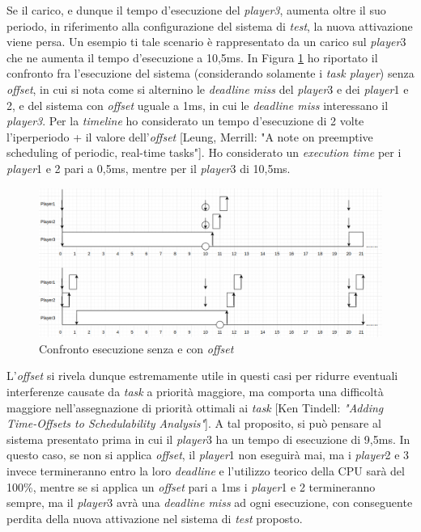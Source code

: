 \documentclass{article}
\begin{document}
Se il carico, e dunque il tempo d'esecuzione del \textit{player3}, aumenta oltre il suo periodo, in riferimento alla configurazione del sistema di \textit{test}, la nuova attivazione viene persa.
Un esempio ti tale scenario è rappresentato da un carico sul \textit{player}3 che ne aumenta il tempo d'esecuzione a 10,5ms.
In Figura \ref{timeline} ho riportato il confronto fra l'esecuzione del sistema (considerando solamente i \textit{task player}) senza \textit{offset}, in cui si nota come si alternino le \textit{deadline miss} del \textit{player}3 e dei \textit{player}1 e 2, e del sistema con \textit{offset} uguale a 1ms, in cui le \textit{deadline miss} interessano il \textit{player3}. Per la \textit{timeline} ho considerato un tempo d'esecuzione di 2 volte l'iperperiodo + il valore dell'\textit{offset} [Leung, Merrill: "A note on preemptive scheduling of periodic, real-time tasks"].
Ho considerato un \textit{execution time} per i \textit{player}1 e 2 pari a 0,5ms, mentre per il \textit{player}3 di 10,5ms.

\begin{figure}[!htbp]
	\centering
	\includegraphics[width=6in]{Approfondimento/timeline.png}
	\caption{Confronto esecuzione senza e con \textit{offset}}
	\label{timeline}
\end{figure}

L'\textit{offset} si rivela dunque estremamente utile in questi casi per ridurre eventuali interferenze causate da \textit{task} a priorità maggiore, ma comporta una difficoltà maggiore nell'assegnazione di priorità ottimali ai \textit{task} [Ken Tindell: \textit{"Adding Time-Offsets to Schedulability Analysis"}].
A tal proposito, si può pensare al sistema presentato prima in cui il \textit{player}3 ha un tempo di esecuzione di 9,5ms. In questo caso, se non si applica \textit{offset}, il \textit{player}1 non eseguirà mai, ma i \textit{player}2 e 3 invece termineranno entro la loro \textit{deadline} e l'utilizzo teorico della CPU sarà del 100\%, mentre se si applica un \textit{offset} pari a 1ms i \textit{player}1 e 2 termineranno sempre, ma il \textit{player}3 avrà una \textit{deadline miss} ad ogni esecuzione, con conseguente perdita della nuova attivazione nel sistema di \textit{test} proposto.
\end{document}
